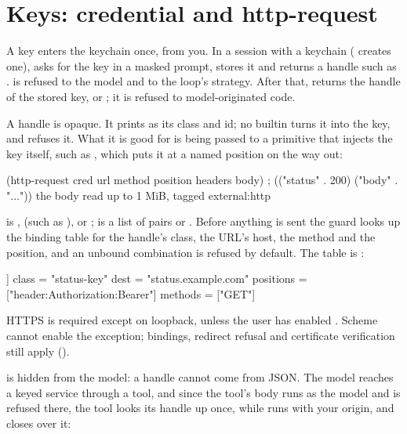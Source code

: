 \section{Keys: credential and http-request}\label{sch:keys}

A key enters the keychain once, from you. In a session with a keychain
( creates one),  asks for the key in a masked prompt, stores it and returns a
handle such as .  is refused to
the model and to the loop's strategy. After that,  returns the handle of the stored key, or ; it is
refused to model-originated code.

A handle is opaque. It prints as its class and id; no builtin turns it into
the key, and  refuses it. What it is good for is being passed
to a primitive that injects the key itself, such as ,
which puts it at a named position on the way out:

\begin{scm}
(http-request cred url method position headers body)
; (("status" . 200) ("body" . "..."))    the body read up to 1 MiB, tagged external:http
\end{scm}

 is ,  (such as
),  or ;
 is a list of  pairs or \code{()}. Before
anything is sent the guard looks up the binding table for the handle's
class, the URL's host, the method and the position, and an unbound
combination is refused by default. The table is :

\begin{txt}
[[bind]]
class     = "status-key"
dest      = "status.example.com"
positions = ["header:Authorization:Bearer"]
methods   = ["GET"]
\end{txt}

HTTPS is required except on loopback, unless the user has enabled
. Scheme cannot enable the exception; bindings,
redirect refusal and certificate verification still apply ().

 is hidden from the model: a handle cannot come from
JSON. The model reaches a keyed service through a tool, and since the tool's
body runs as the model and  is refused there, the tool
looks its handle up once, while  runs with your origin, and
closes over it:

